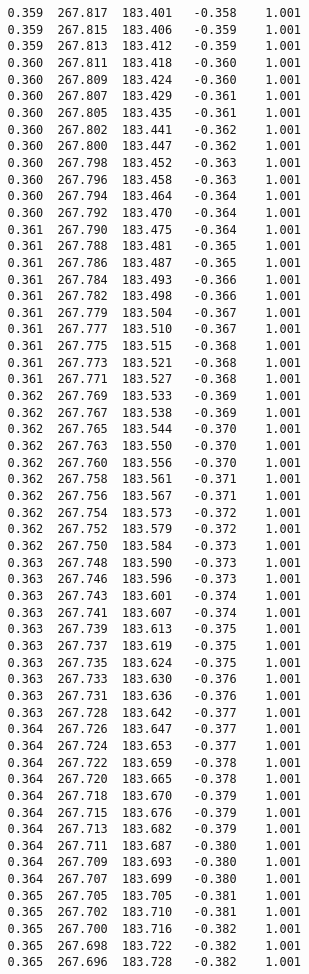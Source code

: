 \begin{verbatim}
   0.359  267.817  183.401   -0.358    1.001
   0.359  267.815  183.406   -0.359    1.001
   0.359  267.813  183.412   -0.359    1.001
   0.360  267.811  183.418   -0.360    1.001
   0.360  267.809  183.424   -0.360    1.001
   0.360  267.807  183.429   -0.361    1.001
   0.360  267.805  183.435   -0.361    1.001
   0.360  267.802  183.441   -0.362    1.001
   0.360  267.800  183.447   -0.362    1.001
   0.360  267.798  183.452   -0.363    1.001
   0.360  267.796  183.458   -0.363    1.001
   0.360  267.794  183.464   -0.364    1.001
   0.360  267.792  183.470   -0.364    1.001
   0.361  267.790  183.475   -0.364    1.001
   0.361  267.788  183.481   -0.365    1.001
   0.361  267.786  183.487   -0.365    1.001
   0.361  267.784  183.493   -0.366    1.001
   0.361  267.782  183.498   -0.366    1.001
   0.361  267.779  183.504   -0.367    1.001
   0.361  267.777  183.510   -0.367    1.001
   0.361  267.775  183.515   -0.368    1.001
   0.361  267.773  183.521   -0.368    1.001
   0.361  267.771  183.527   -0.368    1.001
   0.362  267.769  183.533   -0.369    1.001
   0.362  267.767  183.538   -0.369    1.001
   0.362  267.765  183.544   -0.370    1.001
   0.362  267.763  183.550   -0.370    1.001
   0.362  267.760  183.556   -0.370    1.001
   0.362  267.758  183.561   -0.371    1.001
   0.362  267.756  183.567   -0.371    1.001
   0.362  267.754  183.573   -0.372    1.001
   0.362  267.752  183.579   -0.372    1.001
   0.362  267.750  183.584   -0.373    1.001
   0.363  267.748  183.590   -0.373    1.001
   0.363  267.746  183.596   -0.373    1.001
   0.363  267.743  183.601   -0.374    1.001
   0.363  267.741  183.607   -0.374    1.001
   0.363  267.739  183.613   -0.375    1.001
   0.363  267.737  183.619   -0.375    1.001
   0.363  267.735  183.624   -0.375    1.001
   0.363  267.733  183.630   -0.376    1.001
   0.363  267.731  183.636   -0.376    1.001
   0.363  267.728  183.642   -0.377    1.001
   0.364  267.726  183.647   -0.377    1.001
   0.364  267.724  183.653   -0.377    1.001
   0.364  267.722  183.659   -0.378    1.001
   0.364  267.720  183.665   -0.378    1.001
   0.364  267.718  183.670   -0.379    1.001
   0.364  267.715  183.676   -0.379    1.001
   0.364  267.713  183.682   -0.379    1.001
   0.364  267.711  183.687   -0.380    1.001
   0.364  267.709  183.693   -0.380    1.001
   0.364  267.707  183.699   -0.380    1.001
   0.365  267.705  183.705   -0.381    1.001
   0.365  267.702  183.710   -0.381    1.001
   0.365  267.700  183.716   -0.382    1.001
   0.365  267.698  183.722   -0.382    1.001
   0.365  267.696  183.728   -0.382    1.001

\end{verbatim}
